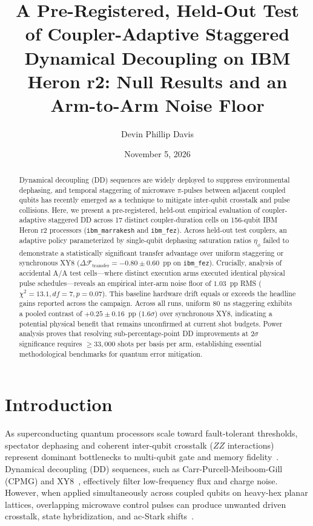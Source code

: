 \documentclass[aps,prl,twocolumn,amsmath,amssymb,superscriptaddress,floatfix]{revtex4-2}
\begin{document}
\title{A Pre-Registered, Held-Out Test of Coupler-Adaptive Staggered Dynamical Decoupling on IBM Heron r2: Null Results and an Arm-to-Arm Noise Floor}

\author{Devin Phillip Davis}

\date{November 5, 2026}

\begin{abstract}
Dynamical decoupling (DD) sequences are widely deployed to suppress environmental dephasing, and temporal staggering of microwave $\pi$-pulses between adjacent coupled qubits has recently emerged as a technique to mitigate inter-qubit crosstalk and pulse collisions. Here, we present a pre-registered, held-out empirical evaluation of coupler-adaptive staggered DD across 17 distinct coupler-duration cells on 156-qubit IBM Heron r2 processors (\texttt{ibm\_marrakesh} and \texttt{ibm\_fez}). Across held-out test couplers, an adaptive policy parameterized by single-qubit dephasing saturation ratios $\eta_\phi$ failed to demonstrate a statistically significant transfer advantage over uniform staggering or synchronous XY8 ($\Delta \mathcal{F}_{\text{transfer}} = -0.80 \pm 0.60$~pp on \texttt{ibm\_fez}). Crucially, analysis of accidental A/A test cells---where distinct execution arms executed identical physical pulse schedules---reveals an empirical inter-arm noise floor of $1.03$~pp RMS ($\chi^2 = 13.1, df = 7, p = 0.07$). This baseline hardware drift equals or exceeds the headline gains reported across the campaign. Across all runs, uniform 80~ns staggering exhibits a pooled contrast of $+0.25 \pm 0.16$~pp ($1.6\sigma$) over synchronous XY8, indicating a potential physical benefit that remains unconfirmed at current shot budgets. Power analysis proves that resolving sub-percentage-point DD improvements at $2\sigma$ significance requires $\ge 33,000$ shots per basis per arm, establishing essential methodological benchmarks for quantum error mitigation.
\end{abstract}

\maketitle

\section{Introduction}
As superconducting quantum processors scale toward fault-tolerant thresholds, spectator dephasing and coherent inter-qubit crosstalk ($ZZ$ interactions) represent dominant bottlenecks to multi-qubit gate and memory fidelity~\cite{Krantz2019, Gambetta2012}. Dynamical decoupling (DD) sequences, such as Carr-Purcell-Meiboom-Gill (CPMG) and XY8~\cite{Viola1998, Viola1999, Pokharel2023, Ezzell2023}, effectively filter low-frequency flux and charge noise. However, when applied simultaneously across coupled qubits on heavy-hex planar lattices, overlapping microwave control pulses can produce unwanted driven crosstalk, state hybridization, and ac-Stark shifts~\cite{Mundada2019}.
\end{document}
